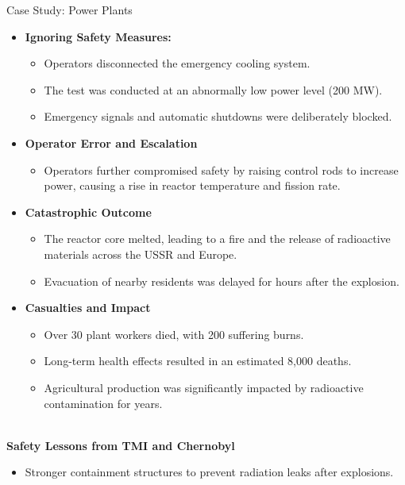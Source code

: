 \documentclass[11pt]{beamer}
\begin{document}
\begin{frame}[t,allowframebreaks]{Case Study: Power Plants}
        \begin{itemize}
            \setlength{\leftmarginii}{10pt}
            \item \textbf{Ignoring Safety Measures:}
            \begin{itemize}
                \item Operators disconnected the emergency cooling system.
                \item The test was conducted at an abnormally low power level (200 MW).
                \item Emergency signals and automatic shutdowns were deliberately blocked.
            \end{itemize}
            \item \textbf{Operator Error and Escalation}
            \begin{itemize}
                \item Operators further compromised safety by raising control rods to increase power, causing a rise
                in reactor temperature and fission rate.
            \end{itemize}
            \item \textbf{Catastrophic Outcome}
            \begin{itemize}
                \item The reactor core melted, leading to a fire and the release of radioactive materials across the
                USSR and Europe.
                \item Evacuation of nearby residents was delayed for hours after the explosion.
            \end{itemize}
            \item \textbf{Casualties and Impact}
            \begin{itemize}
                \item Over 30 plant workers died, with 200 suffering burns.
                \item Long-term health effects resulted in an estimated 8,000 deaths.
                \item Agricultural production was significantly impacted by radioactive contamination for years.
            \end{itemize}
        \end{itemize}
        \\[5pt]
        \textbf{Safety Lessons from TMI and Chernobyl}
        \begin{itemize}
            \item Stronger containment structures to prevent radiation leaks after explosions.

\end{itemize}
\end{frame}
\end{document}
